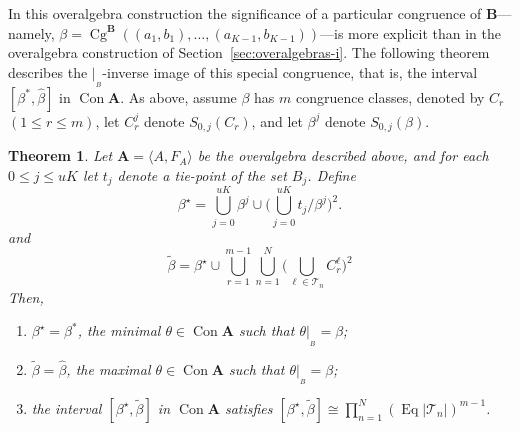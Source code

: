 \documentclass{au}
\numberwithin{equation}{section}
\theoremstyle{plain}
\newtheorem{theorem}{Theorem}[section]
\theoremstyle{definition}
\newcommand{\betaj}{\ensuremath{\beta^j}}  %
\newcommand{\<}{\ensuremath{\langle}}
\renewcommand{\>}{\ensuremath{\rangle}}
\newcommand{\bA}{\ensuremath{\mathbf{A}}}
\newcommand{\bB}{\ensuremath{\mathbf{B}}}
\newcommand{\sT}{\ensuremath{\mathscr{T}}}
\DeclareMathOperator{\Eq}{Eq}
\DeclareMathOperator{\Cg}{Cg}
\DeclareMathOperator{\Con}{Con}
\renewcommand{\leq}{\ensuremath{\leqslant}}
\newcommand{\resB}{\ensuremath{|_{_B}}}
\newcommand{\tbeta}{\ensuremath{\widetilde{\beta}}}
\newcommand{\hbeta}{\ensuremath{\widehat{\beta}}}
\begin{document}
In this overalgebra construction the significance of a particular congruence of
$\bB$---namely,
$\beta = \Cg^{\bB}((a_1, b_1), \dots, (a_{K-1},b_{K-1}))$---is
more explicit than in the overalgebra construction of
Section~\ref{sec:overalgebras-i}.  The following theorem describes the
$\resB$-inverse image of this special congruence, that is, the interval
$[\beta^*,\hbeta]$ in $\Con \bA$.   As above, assume $\beta$ has $m$
congruence classes, denoted by 
$C_r$ $(1\leq r\leq m)$,
let $C_r^j$ denote $S_{0,j}(C_r)$,
and let $\beta^j$ denote $S_{0,j}(\beta)$.
\begin{theorem}
\label{thm:overalgebras-ii}
Let $\bA = \< A, F_A\>$ be the overalgebra described above,
and for each $0\leq j \leq uK$ let $t_j$ denote a tie-point of the set
$B_j$.  Define
\begin{equation}
  \label{eq:OA2-star}
\beta^\star = \bigcup_{j=0}^{uK} \betaj \cup
\bigl(\bigcup_{j=0}^{uK}t_j/\betaj\bigr)^2.
\end{equation}
and
\begin{equation}
  \label{eq:5}
\tbeta   = \beta^\star \cup \bigcup_{r=1}^{m-1}\bigcup_{n=1}^N \bigl(\bigcup_{\ell \in \sT_n} C_r^\ell\bigr)^2
\end{equation}
Then,
\begin{enumerate}[\rm(i)] %
\item \label{item:OA2-i}
$\beta^\star=\beta^*$, the minimal $\theta\in \Con\bA$ such that $\theta\resB = \beta$;
\item
\label{item:OA2-ii}
$\tbeta=\widehat{\beta}$, the maximal $\theta \in \Con\bA$ such that $\theta\resB = \beta$;
\item
\label{item:OA2-iii}
the interval $[\beta^\star, \tbeta]$ in $\Con\bA$
satisfies
$[\beta^\star, \tbeta] \cong \prod_{n=1}^N(\Eq|\sT_n|)^{m-1}$.
\end{enumerate}
\end{theorem}
\end{document}
